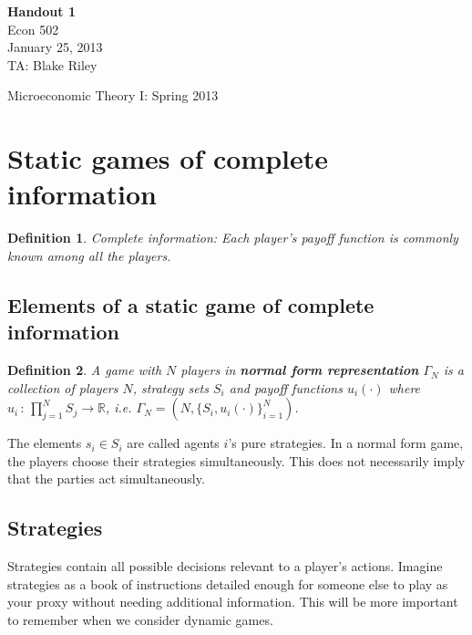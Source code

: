 \documentclass[letter, 10pt]{article}
\newtheorem{definition}{Definition}[section]
\newcommand{\R}{\mathbb{R}}
\begin{document}
\begin{spacing}{1.1}

\noindent
\textbf{Handout 1} \\
Econ 502 \\
January 25, 2013 \\
TA: Blake Riley \\

\begin{center}
{\Large Microeconomic Theory I: Spring 2013}
\end{center}

\section{Static games of complete information}

\begin{definition}
  Complete information: Each player's payoff function is
  commonly known among all the players.
\end{definition}

\subsection{Elements of a static game of complete
  information}

\begin{definition}
  A game with $N$ players in \textbf{normal form
    representation} $\Gamma_N$ is a collection of players
    $N$, strategy sets $S_i$ and payoff functions
    $u_i(\cdot)$ where $u_i \,:\, \prod_{j=1}^N S_j \to
    \R$, i.e. $\Gamma_N = \left(N, \{S_i, u_i(\cdot)\}_{i=1}^N\right)$.
\end{definition}

The elements $s_i \in S_i$ are called agents $i$'s pure strategies. In a
normal form game, the players choose their strategies simultaneously. This
does not necessarily imply that the parties act simultaneously.

\subsection{Strategies}

Strategies contain all possible decisions relevant to a player's
actions. Imagine strategies as a book of instructions detailed enough for
someone else to play as your proxy without needing additional
information. This will be more important to remember when we consider
dynamic games.


\end{spacing}
\end{document}
